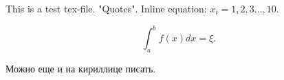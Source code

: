 \documentclass[14pt]{extarticle}
\begin{document}
This is a test tex-file. "Quotes". Inline equation: $x_i = 1, 2, 3\dots, 10.$

\begin{equation}
    \int_{a}^{b}f(x)dx = \xi.
\end{equation}

Можно еще и на кириллице писать.
\end{document}
